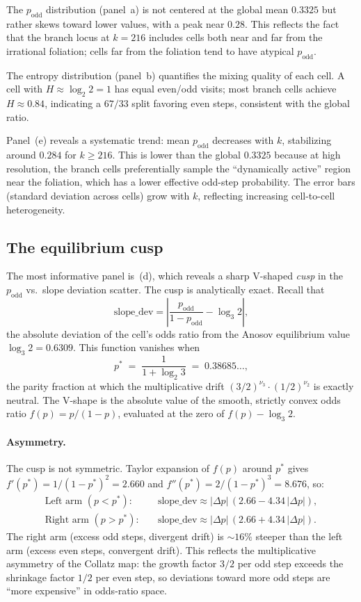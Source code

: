 \documentclass[11pt]{article}
\begin{document}
The $p_{\mathrm{odd}}$ distribution (panel~a) is not centered at the
global mean $0.3325$ but rather skews toward lower values, with a
peak near $0.28$.  This reflects the fact that the branch locus
at $k = 216$ includes cells both near and far from the irrational
foliation; cells far from the foliation tend to have atypical
$p_{\mathrm{odd}}$.

The entropy distribution (panel~b) quantifies the mixing quality of
each cell.  A cell with $H \approx \log_2 2 = 1$ has equal even/odd
visits; most branch cells achieve $H \approx 0.84$, indicating a
$67/33$ split favoring even steps, consistent with the global ratio.

Panel~(e) reveals a systematic trend: mean $p_{\mathrm{odd}}$
decreases with $k$, stabilizing around $0.284$ for $k \ge 216$.
This is lower than the global $0.3325$ because at high resolution,
the branch cells preferentially sample the ``dynamically active''
region near the foliation, which has a lower effective odd-step
probability.  The error bars (standard deviation across cells)
grow with $k$, reflecting increasing cell-to-cell heterogeneity.

\subsection{The equilibrium cusp}
\label{sec:cusp}

The most informative panel is~(d), which reveals a sharp V-shaped
\emph{cusp} in the $p_{\mathrm{odd}}$ vs.\ slope deviation scatter.
The cusp is analytically exact.  Recall that
\[
  \mathrm{slope\_dev} = \left|\frac{p_{\mathrm{odd}}}{1 - p_{\mathrm{odd}}}
  - \log_3 2\right|,
\]
the absolute deviation of the cell's odds ratio from the Anosov
equilibrium value $\log_3 2 = 0.6309$.  This function vanishes when
\[
  p^* \;=\; \frac{1}{1 + \log_2 3} \;=\; 0.38685\ldots,
\]
the parity fraction at which the multiplicative drift
$(3/2)^{\nu_3} \cdot (1/2)^{\nu_2}$ is exactly neutral.  The
V-shape is the absolute value of the smooth, strictly convex odds
ratio $f(p) = p/(1-p)$, evaluated at the zero of $f(p) - \log_3 2$.

\paragraph{Asymmetry.}
The cusp is not symmetric.  Taylor expansion of $f(p)$ around $p^*$
gives $f'(p^*) = 1/(1-p^*)^2 = 2.660$ and
$f''(p^*) = 2/(1-p^*)^3 = 8.676$, so:
\begin{align*}
  \text{Left arm } (p < p^*)\colon\quad
  &\mathrm{slope\_dev} \approx |\Delta p|\,(2.66 - 4.34\,|\Delta p|), \\
  \text{Right arm } (p > p^*)\colon\quad
  &\mathrm{slope\_dev} \approx |\Delta p|\,(2.66 + 4.34\,|\Delta p|).
\end{align*}
The right arm (excess odd steps, divergent drift) is $\sim\!16\%$
steeper than the left arm (excess even steps, convergent drift).
This reflects the multiplicative asymmetry of the Collatz map:
the growth factor $3/2$ per odd step exceeds the shrinkage factor
$1/2$ per even step, so deviations toward more odd steps are
``more expensive'' in odds-ratio space.
\end{document}
